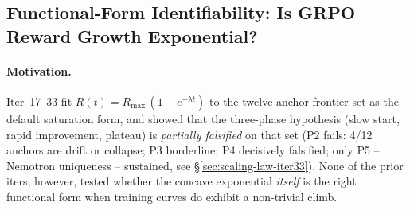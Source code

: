 \subsection{Functional-Form Identifiability: Is GRPO Reward Growth Exponential?}
\label{sec:scaling-law-iter37}
\label{sec:iter37}

\paragraph{Motivation.}
Iter~17--33 fit $R(t) = R_{\max}\,(1 - e^{-\lambda t})$ to the twelve-anchor
frontier set as the default saturation form, and showed that the
three-phase hypothesis (slow start, rapid improvement, plateau) is
\emph{partially falsified} on that set (P2 fails: 4/12 anchors are drift
or collapse; P3 borderline; P4 decisively falsified; only P5 -- Nemotron
uniqueness -- sustained, see \S\ref{sec:scaling-law-iter33}). None of
the prior iters, however, tested whether the concave exponential
\emph{itself} is the right functional form when training curves do
exhibit a non-trivial climb.

